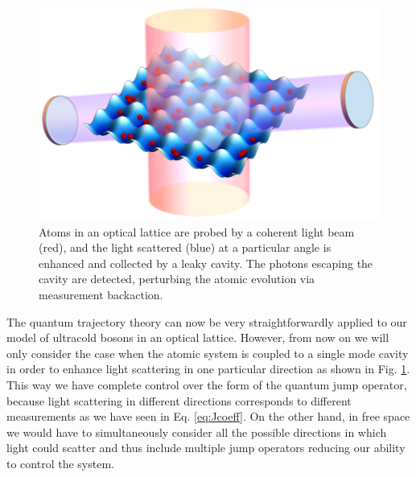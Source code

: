 \begin{figure}[htbp!]
  \centering
  \includegraphics[width=1.0\textwidth]{setup}
  \caption[Experimental Setup with Cavity]{Atoms in an optical lattice
    are probed by a coherent light beam (red), and the light scattered
    (blue) at a particular angle is enhanced and collected by a leaky
    cavity. The photons escaping the cavity are detected, perturbing
    the atomic evolution via measurement backaction.}
  \label{fig:cavity}
\end{figure}

The quantum trajectory theory can now be very straightforwardly
applied to our model of ultracold bosons in an optical
lattice. However, from now on we will only consider the case when the
atomic system is coupled to a single mode cavity in order to enhance
light scattering in one particular direction as shown in
Fig. \ref{fig:cavity}. This way we have complete control over the form
of the quantum jump operator, because light scattering in different
directions corresponds to different measurements as we have seen in
Eq. \eqref{eq:Jcoeff}. On the other hand, in free space we would have
to simultaneously consider all the possible directions in which light
could scatter and thus include multiple jump operators reducing our
ability to control the system.

